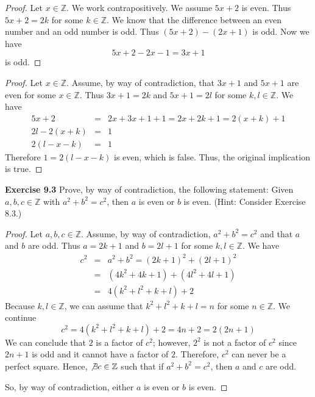\documentclass[12pt,oneside]{article}
\newenvironment{exercise}[1]{\vspace{.1in}\noindent\textbf{Exercise #1 \hspace{.05em}}}{}
\newcommand{\Z}{\mathbb{Z}}
\begin{document}
\begin{proof}
Let $x \in \Z$. We work contrapositively. We assume $5x + 2$ is even. Thus $5x + 2 = 2k$ for some $k \in \Z$. We know that the difference between an even number and an odd number is odd. Thus $(5x + 2) - (2x + 1)$ is odd. Now we have
\[5x + 2 - 2x - 1 = 3x + 1\]
is odd.
\end{proof}

\begin{proof}
Let $x \in \Z$. Assume, by way of contradiction, that $3x + 1$ and $5x + 1$ are even for some $x \in \Z$. Thus $3x + 1 = 2k$ and $5x + 1 = 2l$ for some $k, l \in \Z$. We have
\begin{eqnarray*}
5x + 2 &=& 2x + 3x + 1 + 1 = 2x + 2k + 1 = 2(x + k) + 1\\
2l - 2(x + k) &=& 1 \\
2(l - x - k) &=& 1
\end{eqnarray*}
Therefore $1 = 2(l - x - k)$ is even, which is false. Thus, the original implication is true.
\end{proof}



\begin{exercise}{9.3}
Prove, by way of contradiction, the following statement: Given $a,b,c \in \Z$ with $a^2 + b^2 = c^2$, then $a$ is even or $b$ is even. (Hint: Consider Exercise 8.3.)
\end{exercise}

\begin{proof}
Let $a,b,c \in \Z$. Assume, by way of contradiction, $a^2 + b^2 = c^2$ and that $a$ and $b$ are odd. Thus $a = 2k + 1$ and $b = 2l + 1$ for some $k, l \in \Z$. We have
\begin{eqnarray*}
c^2 &=& a^2 + b^2 = (2k + 1)^2 + (2l + 1)^2 \\
&=& (4k^2 + 4k + 1) + (4l^2 + 4l + 1) \\
&=& 4(k^2 + l^2 + k + l) + 2 
\end{eqnarray*}
Because $k,l \in \Z$, we can assume that $k^2 + l^2 + k + l = n$ for some $n \in \Z$. We continue
\[c^2 = 4(k^2 + l^2 + k + l) + 2 = 4n + 2 = 2(2n + 1)\]
We can conclude that $2$ is a factor of $c^2$; however, $2^2$ is not a factor of $c^2$ since $2n + 1$ is odd and it cannot have a factor of $2$. Therefore, $c^2$ can never be a perfect square. Hence, $\not\exists c \in \Z$ such that if $a^2 + b^2 = c^2$, then $a$ and $c$ are odd.

So, by way of contradiction, either $a$ is even or $b$ is even.
\end{proof}
\end{document}
